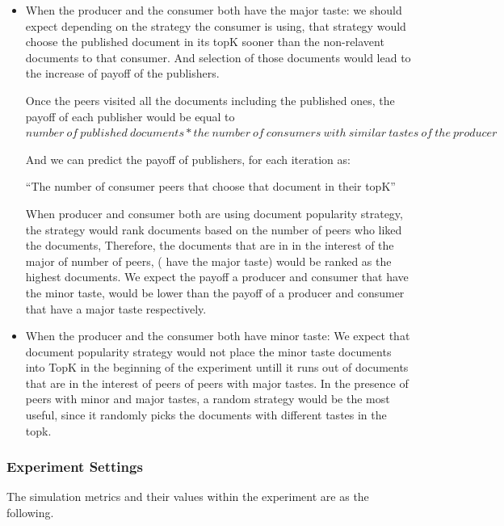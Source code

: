 \documentclass [12pt]{article} \usepackage{multicol}
\begin{document}
	\begin{itemize}

	\item When the producer and the consumer  both have the major
taste: we should expect depending on the strategy the consumer is
using, that strategy would choose the published document in its topK
sooner than the non-relavent documents to that consumer. And
selection of those documents would lead to the increase of payoff of
the publishers.

	Once the peers visited all the documents including the published
ones, the payoff of each publisher would be equal to  $ {number\ of\
published\ documents} * {the\ number\ of\ consumers\ with\ similar\
tastes\ of\ the\ producer} $


	And we can predict the payoff of publishers, for each iteration
as:

	``The number of consumer peers that choose that document in their
topK''

	When producer and consumer both are using document popularity
strategy, the strategy would rank documents based on the number of
peers who liked the documents, Therefore, the documents that are in
in the interest of the major of number of peers, ( have the major
taste) would be ranked as the highest documents. We expect the payoff
a producer and consumer that have the minor taste, would be lower
than the payoff of a producer and consumer that have a major taste
respectively.




	\item When the producer and the consumer both have minor taste:
We expect that document popularity strategy would not place the minor
taste documents into TopK in the beginning of the experiment untill
it runs out of documents that are in the interest of peers of peers
with major tastes. In the presence of peers with minor and major
tastes, a random strategy would be the most useful, since it randomly
picks the documents with different tastes in the topk.

	\end{itemize}

\subsubsection{Experiment Settings}

The simulation metrics and their values within the experiment are as the following.
\end{document}
